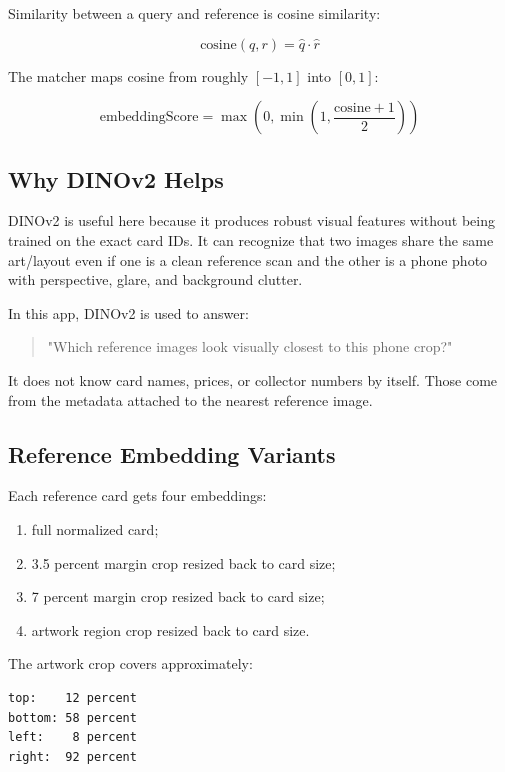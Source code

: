 \documentclass[11pt,a4paper]{article}
\begin{document}
Similarity between a query and reference is cosine similarity:

\[
\text{cosine}(q, r) = \hat{q} \cdot \hat{r}
\]

The matcher maps cosine from roughly \([-1,1]\) into \([0,1]\):

\[
\text{embeddingScore} = \max(0, \min(1, \frac{\text{cosine} + 1}{2}))
\]

\subsection{Why DINOv2 Helps}

DINOv2 is useful here because it produces robust visual features without being trained on the exact card IDs. It can recognize that two images share the same art/layout even if one is a clean reference scan and the other is a phone photo with perspective, glare, and background clutter.

In this app, DINOv2 is used to answer:

\begin{quote}
"Which reference images look visually closest to this phone crop?"
\end{quote}

It does not know card names, prices, or collector numbers by itself. Those come from the metadata attached to the nearest reference image.

\subsection{Reference Embedding Variants}

Each reference card gets four embeddings:

\begin{enumerate}
  \item full normalized card;
  \item 3.5 percent margin crop resized back to card size;
  \item 7 percent margin crop resized back to card size;
  \item artwork region crop resized back to card size.
\end{enumerate}

The artwork crop covers approximately:

\begin{lstlisting}
top:    12 percent
bottom: 58 percent
left:    8 percent
right:  92 percent
\end{lstlisting}
\end{document}
